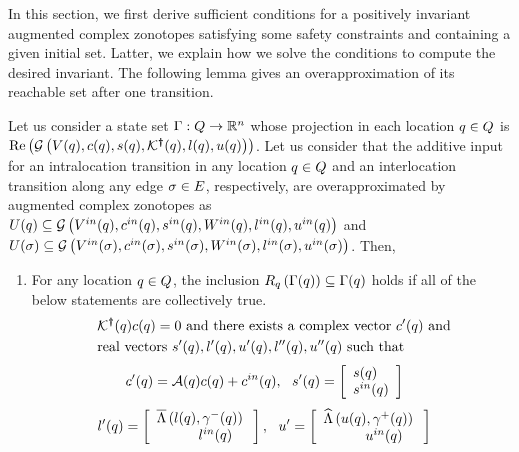 

In this section, we first derive sufficient conditions for a
positively invariant augmented complex zonotopes satisfying some
safety constraints and containing a given initial set.  Latter, we
explain how we solve the conditions to compute the desired invariant.
The following lemma gives an overapproximation of its reachable set
after one transition.

%
\begin{lemma}
  Let us consider a state set $\Gamma:Q\rightarrow\mathbb{R}^n$
  whose projection in each location $q\in Q$ is
  $\operatorname{\operatorname{Re}}\left(\mathcal{G}\left(V(q),c(q),s(q),\mathcal{K}^{\bm{\dagger}}(q),l(q),u(q)\right)\right)$.
  Let us consider that the additive input for an intralocation
  transition in any location $q\in Q$ and an
  interlocation transition along any edge $\sigma\in E$,
  respectively, are overapproximated by augmented complex zonotopes as
  $U(q)\subseteq
  \mathcal{G}\left(V^{in}(q),c^{in}(q),s^{in}(q),W^{in}(q),l^{in}(q),u^{in}(q)\right)$
  and $U(\sigma)\subseteq
  \mathcal{G}\left(V^{in}(\sigma),c^{in}(\sigma),s^{in}(\sigma),W^{in}(\sigma),l^{in}(\sigma),u^{in}(\sigma)\right)$.
  Then,
\begin{enumerate}
\item For any location $q\in Q$, the inclusion
  $R_{q}\left(\Gamma(q)\right)\subseteq
  \Gamma(q)$ holds if all of the below statements are
  collectively true.
\begin{align}~\label{eqn:locinv}
\begin{split}
& \mathcal{K}^{\bm{\dagger}}(q)c(q) = 0~\text{and there exists a complex vector}~
  c^\prime(q)~\text{and}\\
& \text{real
    vectors}~s^\prime(q),l^\prime(q),u^\prime(q),l^{\prime\prime}(q),u^{\prime\prime}(q)~\text{such
    that}\\
\end{split}
\end{align}
\vspace{-1.5em}
\begin{align}
& c^\prime(q) = \mathcal{A}(q)c(q)+c^{in}(q),~~s^\prime(q) =
  \left[\begin{array}{l}{s(q)}\\{s^{in}(q)} \end{array}\right]
\end{align}
\vspace{-1.5em}
\begin{align}
& l^\pr(\loc) =
  \ColumnJoin{\maxaffine{l(\loc)}{\stay^-(\loc)}}{~~~~~~~~~l^{in}(\loc)~~~},~~u^\pr
  =
  \ColumnJoin{\minaffine{u(\loc)}{\stay^+(\loc)}}{~~~~~~~~~u^{in}(\loc)~~~}

\end{align}
\end{enumerate}
\end{lemma}
